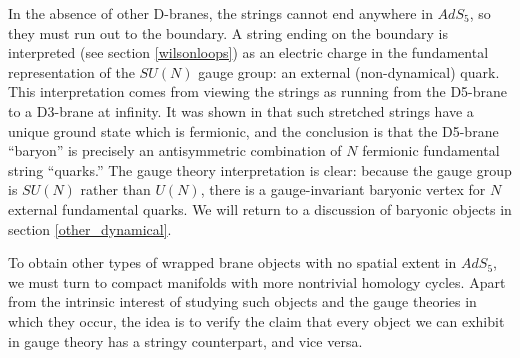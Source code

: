 In the absence of other D-branes, the strings cannot end anywhere in
$AdS_5$, so they must run out to the boundary.  A string ending on the
boundary is interpreted (see section \ref{wilsonloops})
as an electric charge in the fundamental
representation of the $SU(N)$ gauge group: an external (non-dynamical)
quark. 
This interpretation comes from viewing the strings
as running from the D5-brane to a
D3-brane at infinity.  It was shown in
\cite{Bachas:1997ui} that such stretched strings have a unique ground
state which is fermionic, 
and the conclusion is that the D5-brane ``baryon'' is
precisely an antisymmetric combination of $N$ fermionic fundamental string
``quarks.''  The gauge theory interpretation is clear: because the gauge
group is $SU(N)$ rather than $U(N)$, there is a gauge-invariant
baryonic vertex for $N$
external fundamental quarks.  We will return to a discussion of baryonic
objects in section \ref{other_dynamical}.

To obtain other types of wrapped brane objects with no spatial extent in
$AdS_5$, we must turn to compact manifolds with more nontrivial homology
cycles.  Apart from the intrinsic interest of studying such objects and the
gauge theories in which they occur, the idea is to verify the claim that
every object we can exhibit in gauge theory has a stringy counterpart, and
vice versa.



